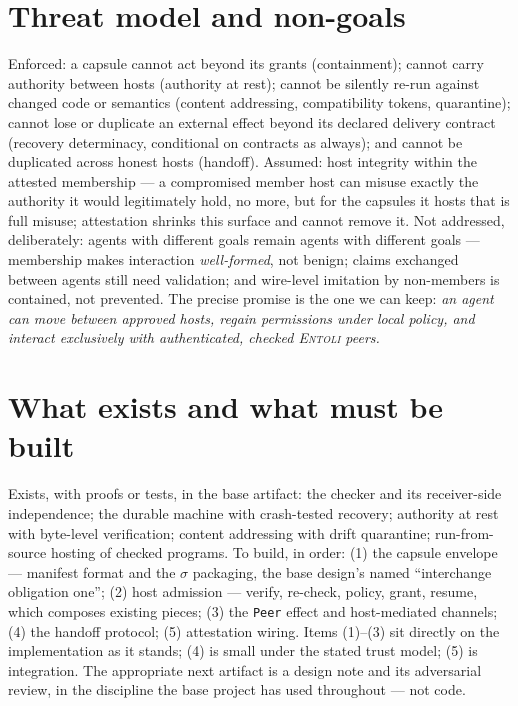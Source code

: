 \documentclass[sigplan,10pt]{acmart}
\begin{document}
\section{Threat model and non-goals}

Enforced: a capsule cannot act beyond its grants (containment); cannot
carry authority between hosts (authority at rest); cannot be silently
re-run against changed code or semantics (content addressing,
compatibility tokens, quarantine); cannot lose or duplicate an external
effect beyond its declared delivery contract (recovery determinacy,
conditional on contracts as always); and cannot be duplicated across
honest hosts (handoff). Assumed: host integrity within the attested
membership --- a compromised member host can misuse exactly the
authority it would legitimately hold, no more, but for the capsules it
hosts that is full misuse; attestation shrinks this surface and cannot
remove it. Not addressed, deliberately: agents with different goals
remain agents with different goals --- membership makes interaction
\emph{well-formed}, not benign; claims exchanged between agents still
need validation; and wire-level imitation by non-members is contained,
not prevented. The precise promise is the one we can keep: \emph{an
agent can move between approved hosts, regain permissions under local
policy, and interact exclusively with authenticated, checked
\textsc{Entoli} peers.}

\section{What exists and what must be built}

Exists, with proofs or tests, in the base artifact: the checker and its
receiver-side independence; the durable machine with crash-tested
recovery; authority at rest with byte-level verification; content
addressing with drift quarantine; run-from-source hosting of checked
programs. To build, in order: (1) the capsule envelope --- manifest
format and the $\sigma$ packaging, the base design's named
``interchange obligation one''; (2) host admission --- verify, re-check,
policy, grant, resume, which composes existing pieces; (3) the
\texttt{Peer} effect and host-mediated channels; (4) the handoff
protocol; (5) attestation wiring. Items (1)--(3) sit directly on the
implementation as it stands; (4) is small under the stated trust model;
(5) is integration. The appropriate next artifact is a design note and
its adversarial review, in the discipline the base project has used
throughout --- not code.
\end{document}
